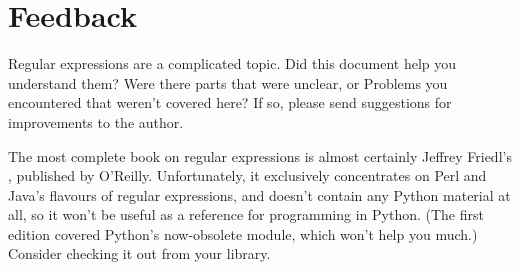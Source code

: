 \documentclass{howto}
\begin{document}
\section{Feedback}

Regular expressions are a complicated topic.  Did this document help
you understand them?  Were there parts that were unclear, or Problems
you encountered that weren't covered here?  If so, please send
suggestions for improvements to the author.

The most complete book on regular expressions is almost certainly
Jeffrey Friedl's , published
by O'Reilly.  Unfortunately, it exclusively concentrates on Perl and
Java's flavours of regular expressions, and doesn't contain any Python
material at all, so it won't be useful as a reference for programming
in Python.  (The first edition covered Python's now-obsolete
 module, which won't help you much.)  Consider checking
it out from your library.
\end{document}
